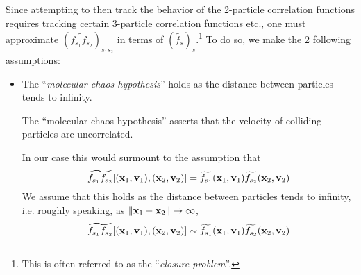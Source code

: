     Since attempting to then track the behavior of the 2-particle correlation functions requires tracking certain 3-particle correlation functions etc., one must approximate $\left(\widetilde{f_{s_{1}}f_{s_{2}}}\right)_{s_{1}s_{2}}$ in terms of $\left(\widetilde{f_{s}}\right)_{s}$.\footnote{This is often referred to as the ``\emph{closure problem}''.} To do so, we make the 2 following assumptions:
    \begin{itemize}
        \item  The ``\emph{molecular chaos hypothesis}'' holds as the distance between particles tends to infinity.
        \begin{definition}
            The ``molecular chaos hypothesis'' asserts that the velocity of colliding particles are uncorrelated. \BA{[Ref]}
        \end{definition}
        In our case this would surmount to the assumption that
        \begin{equation}
            \widetilde{f_{s_{1}}f_{s_{2}}}[(\mathbf{x}_{1}, \mathbf{v}_{1}), (\mathbf{x}_{2}, \mathbf{v}_{2})]  =  \widetilde{f_{s_{1}}}(\mathbf{x}_{1}, \mathbf{v}_{1})\widetilde{f_{s_{2}}}(\mathbf{x}_{2}, \mathbf{v}_{2})
        \end{equation}
        We assume that this holds as the distance between particles tends to infinity, i.e. roughly speaking, as $\|\mathbf{x}_{1} - \mathbf{x}_{2}\|  \rightarrow  \infty$,
        \begin{equation}
            \widetilde{f_{s_{1}}f_{s_{2}}}[(\mathbf{x}_{1}, \mathbf{v}_{1}), (\mathbf{x}_{2}, \mathbf{v}_{2})]  \sim  \widetilde{f_{s_{1}}}(\mathbf{x}_{1}, \mathbf{v}_{1})\widetilde{f_{s_{2}}}(\mathbf{x}_{2}, \mathbf{v}_{2})
        \end{equation}
    \end{itemize}

    